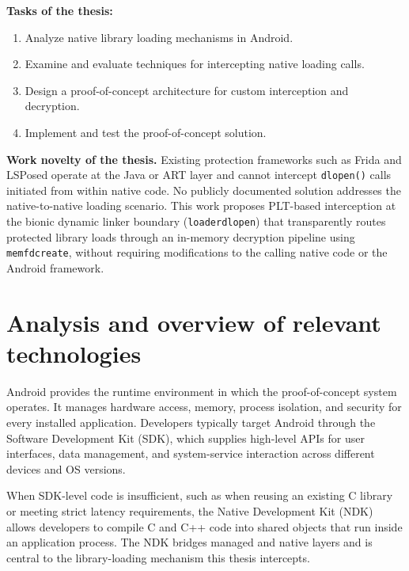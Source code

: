\documentclass[11pt,a4paper]{report}
\renewcommand\_{{\textunderscore\allowbreak}}
\begin{document}
\textbf{Tasks of the thesis:}
\begin{enumerate}
    \item Analyze native library loading mechanisms in Android.
    \item Examine and evaluate techniques for intercepting native loading calls.
    \item Design a proof-of-concept architecture for custom interception and decryption.
    \item Implement and test the proof-of-concept solution.
\end{enumerate}

\textbf{Work novelty of the thesis.} Existing protection frameworks such as Frida and LSPosed operate at the Java or ART layer and cannot intercept \texttt{dlopen()} calls initiated from within native code. No publicly documented solution addresses the native-to-native loading scenario. This work proposes PLT-based interception at the bionic dynamic linker boundary (\texttt{\_\_loader\_dlopen}) that transparently routes protected library loads through an in-memory decryption pipeline using \texttt{memfd\_create}, without requiring modifications to the calling native code or the Android framework.

\newpage

\section{Analysis and overview of relevant technologies}

Android provides the runtime environment in which the proof-of-concept system operates.  It manages hardware access, memory, process isolation, and security for every installed application.  Developers typically target Android through the Software Development Kit (SDK), which supplies high-level APIs for user interfaces, data management, and system-service interaction across different devices and OS versions.

When SDK-level code is insufficient, such as when reusing an existing C library or meeting strict latency requirements, the Native Development Kit (NDK) allows developers to compile C and C++ code into shared objects that run inside an application process.  The NDK bridges managed and native layers and is central to the library-loading mechanism this thesis intercepts.
\end{document}
